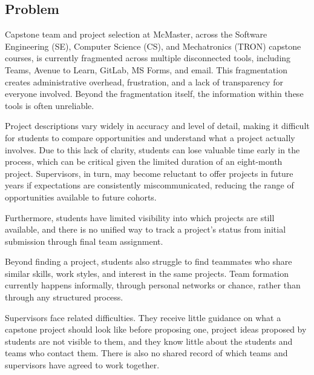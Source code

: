 \documentclass{article}
\begin{document}
\subsection{Problem}


Capstone team and project selection at McMaster, across the Software
Engineering (SE), Computer Science (CS), and Mechatronics (TRON) capstone
courses, is currently fragmented across multiple disconnected tools, including
Teams, Avenue to Learn, GitLab, MS Forms, and email. This fragmentation creates
administrative overhead, frustration, and a lack of transparency for everyone
involved. Beyond the fragmentation itself, the information within these tools
is often unreliable.

Project descriptions vary widely in accuracy and level of detail, making it
difficult for students to compare opportunities and understand what a project
actually involves. Due to this lack of clarity, students can lose valuable time
early in the process, which can be critical given the limited duration of an
eight-month project. Supervisors, in turn, may become reluctant to offer
projects in future years if expectations are consistently miscommunicated,
reducing the range of opportunities available to future cohorts.

Furthermore, students have limited visibility into which projects are still
available, and there is no unified way to track a project's status from initial
submission through final team assignment.

Beyond finding a project, students also struggle to find teammates who share
similar skills, work styles, and interest in the same projects. Team formation
currently happens informally, through personal networks or chance, rather than
through any structured process.

Supervisors face related difficulties. They receive little guidance on what a
capstone project should look like before proposing one, project ideas
proposed by students are not visible to them, and they know little about the
students and teams who contact them. There is also no shared record of which
teams and supervisors have agreed to work together.
\end{document}
